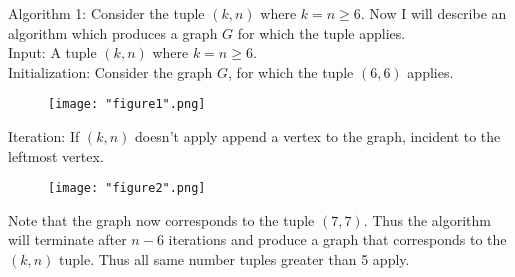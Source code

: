 \documentclass{amsart}
\begin{document}
\begin{enumerate}
Algorithm 1:
Consider the tuple $(k,n)$ where $k = n \geq 6$. Now I will describe an algorithm which produces a graph $G$ for which the tuple applies.\\
Input: A tuple $(k,n)$ where $k = n \geq 6$.\\
Initialization: Consider the graph $G$, for which the tuple $(6,6)$ applies.
\begin{figure}[H]
\caption{}
\centering
\texttt{[image: "figure1".png]}
\end{figure}
Iteration: If $(k,n)$ doesn't apply append a vertex to the graph, incident to the leftmost vertex. 
\begin{figure}[H]
\caption{}
\centering
\texttt{[image: "figure2".png]}
\end{figure}
Note that the graph now corresponds to the tuple $(7,7)$. Thus the algorithm will terminate after $n-6$ iterations and produce a graph that corresponds to the $(k,n)$ tuple. Thus all same number tuples greater than 5 apply. \\\\



\end{enumerate}
\end{document}
